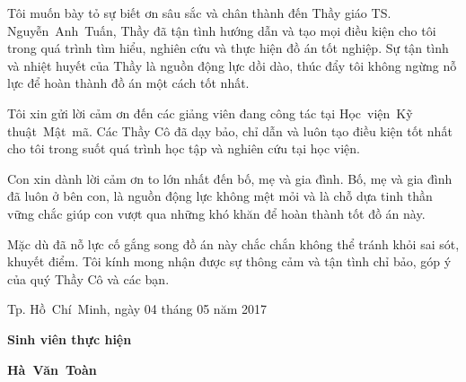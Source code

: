 \begin{acknowledgements}
Tôi muốn bày tỏ sự biết ơn sâu sắc và chân thành đến Thầy giáo TS. Nguyễn~Anh~Tuấn, Thầy đã tận tình hướng dẫn và tạo mọi điều kiện cho tôi trong quá trình tìm hiểu, nghiên cứu và thực hiện đồ án tốt nghiệp. Sự tận tình và nhiệt huyết của Thầy là nguồn động lực dồi dào, thúc đẩy tôi không ngừng nỗ lực để hoàn thành đồ án một cách tốt nhất.

Tôi xin gửi lời cảm ơn đến các giảng viên đang công tác tại Học~viện~Kỹ thuật~Mật~mã. Các Thầy Cô đã dạy bảo, chỉ dẫn và luôn tạo điều kiện tốt nhất cho tôi trong suốt quá trình học tập và nghiên cứu tại học viện.

Con xin dành lời cảm ơn to lớn nhất đến bố, mẹ và gia đình. Bố, mẹ và gia đình đã luôn ở bên con, là nguồn động lực không mệt mỏi và là chỗ dựa tinh thần vững chắc giúp con vượt qua những khó khăn để hoàn thành tốt đồ án này.

Mặc dù đã nỗ lực cố gắng song đồ án này chắc chắn không thể tránh khỏi sai sót, khuyết điểm. Tôi kính mong nhận được sự thông cảm và tận tình chỉ bảo, góp ý của quý Thầy Cô và các bạn.

\begin{flushright}
    Tp. Hồ~Chí~Minh, ngày 04 tháng 05 năm 2017

    {\textbf{Sinh viên thực hiện}\hspace*{1.25cm}\par}
    \vspace*{1cm}
    \textbf{Hà~Văn~Toàn}\hspace*{2cm}
\end{flushright}
\end{acknowledgements}
  